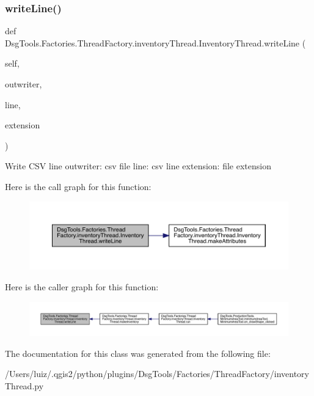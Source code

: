 \subsubsection{\texorpdfstring{write\+Line()}{writeLine()}}
{\footnotesize\ttfamily def Dsg\+Tools.\+Factories.\+Thread\+Factory.\+inventory\+Thread.\+Inventory\+Thread.\+write\+Line (\begin{DoxyParamCaption}\item[{}]{self,  }\item[{}]{outwriter,  }\item[{}]{line,  }\item[{}]{extension }\end{DoxyParamCaption})}

\begin{DoxyVerb}Write CSV line
outwriter: csv file
line: csv line
extension: file extension
\end{DoxyVerb}
 Here is the call graph for this function\+:
\nopagebreak
\begin{figure}[H]
\begin{center}
\leavevmode
\includegraphics[width=350pt]{class_dsg_tools_1_1_factories_1_1_thread_factory_1_1inventory_thread_1_1_inventory_thread_af9397bb34d4df98d8074f960296fd412_cgraph}
\end{center}
\end{figure}
Here is the caller graph for this function\+:
\nopagebreak
\begin{figure}[H]
\begin{center}
\leavevmode
\includegraphics[width=350pt]{class_dsg_tools_1_1_factories_1_1_thread_factory_1_1inventory_thread_1_1_inventory_thread_af9397bb34d4df98d8074f960296fd412_icgraph}
\end{center}
\end{figure}


The documentation for this class was generated from the following file\+:\begin{DoxyCompactItemize}
\item 
/\+Users/luiz/.\+qgis2/python/plugins/\+Dsg\+Tools/\+Factories/\+Thread\+Factory/inventory\+Thread.\+py\end{DoxyCompactItemize}
